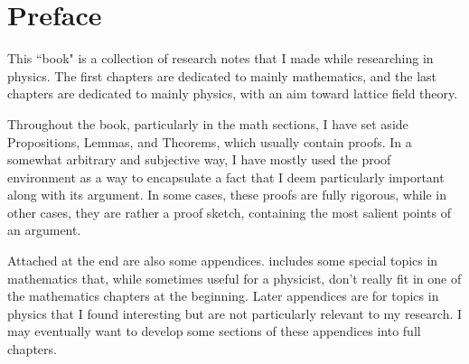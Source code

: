\documentclass[12pt]{book}
\theoremstyle{definition}
\begin{document}
\chapter{Preface}
This ``book" is a collection of research notes that I made while researching in
physics. The first chapters are dedicated to mainly mathematics, and the last
chapters are dedicated to mainly physics, with an aim toward lattice field
theory. 

Throughout the book, particularly in the math sections, I have set aside
Propositions, Lemmas, and Theorems, which usually contain proofs. 
In a somewhat arbitrary and
subjective way, I have mostly used the proof environment as a way to encapsulate
a fact that I deem particularly important along with its argument.
In some cases, these proofs are fully rigorous, while in other cases, they are 
rather a proof sketch,
containing the most salient points of an argument. 

Attached at the end are also some appendices. 
 includes some special topics in mathematics 
that, while sometimes useful for a physicist, don't really fit in one of 
the mathematics chapters at the beginning.
Later appendices are for topics in physics that I found interesting but are
not particularly relevant to my research.
I may eventually want
to develop some sections of these appendices into full chapters.


\tableofcontents                        %
\mainmatter                             %




%












\begin{appendices}




%

\end{appendices}


\printindex
\end{document}

